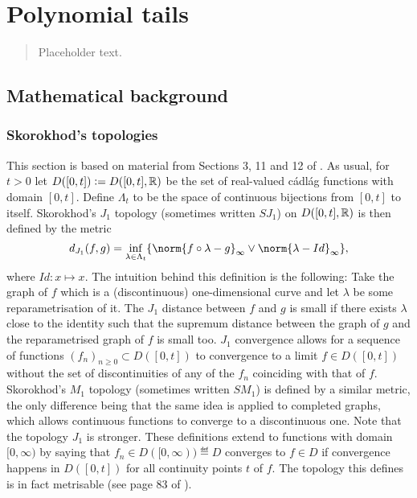 \section{Polynomial tails}

\begin{quote}
{\small Placeholder text. }
\end{quote}

\subsection{Mathematical background}
\subsubsection{Skorokhod's topologies}
This section is based on material from Sections 3, 11 and 12 of \cite{jacod2013limit}. As usual, for $t > 0$ let $D([0, t]) \vcentcolon= D([0, t], \mathbb{R})$ be the set of real-valued cádlág functions with domain $[0, t]$. Define $\Lambda_t$ to be the space of continuous bijections from $[0,t]$ to itself. Skorokhod's $J_1$ topology (sometimes written $SJ_1$) on $D([0,t], \mathbb{R})$ is then defined by the metric 
\begin{equation}
d_{J_1}(f,g) = \inf_{\lambda \in \Lambda_t} \{ \norm{f \circ \lambda - g}_{\infty} \lor \norm{\lambda - Id}_{\infty} \}, 
\end{equation}
where $Id : x \mapsto x$. The intuition behind this definition is the following: Take the graph of $f$ which is a (discontinuous) one-dimensional curve and let $\lambda$ be some reparametrisation of it. The $J_1$ distance between $f$ and $g$ is small if there exists $\lambda$ close to the identity such that the supremum distance between the graph of $g$ and the reparametrised graph of $f$ is small too. $J_1$ convergence allows for a sequence of functions $(f_n)_{n \geq 0} \subset D([0, t])$ to convergence to a limit $f\in D([0, t])$ without the set of discontinuities of any of the $f_n$ coinciding with that of $f$. Skorokhod's $M_1$ topology (sometimes written $SM_1$) is defined by a similar metric, the only difference being that the same idea is applied to completed graphs, which allows continuous functions to converge to a discontinuous one. Note that the topology $J_1$ is stronger. These definitions extend to functions with domain $[0, \infty)$ by saying that $f_n \in D([0, \infty)) \eqdef D$ converges to $f \in D$ if convergence happens in $D([0, t])$ for all continuity points $t$ of $f$. The topology this defines is in fact metrisable (see page 83 of \cite{jacod2013limit}). \\


